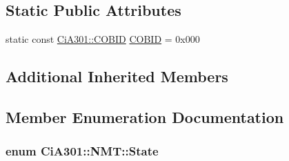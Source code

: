 \subsection*{Static Public Attributes}
\begin{DoxyCompactItemize}
\item 
static const \hyperlink{namespace_ci_a301_aec5b5dbb2b60d2837c60499f6f297aa7}{Ci\-A301\-::\-C\-O\-B\-I\-D} \hyperlink{struct_ci_a301_1_1_n_m_t_ab147f93934382f086899ab39d045603f}{C\-O\-B\-I\-D} = 0x000
\end{DoxyCompactItemize}
\subsection*{Additional Inherited Members}


\subsection{Member Enumeration Documentation}
\hypertarget{struct_ci_a301_1_1_n_m_t_a08d5e3b45a55a112518bdcc06ff3617a}{
\subsubsection[{State}]{\setlength{\rightskip}{0pt plus 5cm}enum {\bf Ci\-A301\-::\-N\-M\-T\-::\-State}}}\label{struct_ci_a301_1_1_n_m_t_a08d5e3b45a55a112518bdcc06ff3617a}
